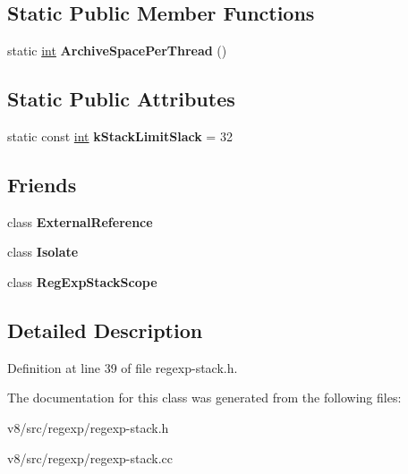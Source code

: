 \subsection*{Static Public Member Functions}
\begin{DoxyCompactItemize}
\item 
\mbox{\label{classv8_1_1internal_1_1RegExpStack_aee574d88604a5759319c17356a2202f4}} 
static \mbox{\hyperlink{classint}{int}} {\bfseries Archive\+Space\+Per\+Thread} ()
\end{DoxyCompactItemize}
\subsection*{Static Public Attributes}
\begin{DoxyCompactItemize}
\item 
\mbox{\label{classv8_1_1internal_1_1RegExpStack_a204fe3ec05de664a5b0d89cb4150f069}} 
static const \mbox{\hyperlink{classint}{int}} {\bfseries k\+Stack\+Limit\+Slack} = 32
\end{DoxyCompactItemize}
\subsection*{Friends}
\begin{DoxyCompactItemize}
\item 
\mbox{\label{classv8_1_1internal_1_1RegExpStack_a6cad52a007e84a78f169131b667e2d49}} 
class {\bfseries External\+Reference}
\item 
\mbox{\label{classv8_1_1internal_1_1RegExpStack_aba4f0964bdacf2bbf62cf876e5d28d0a}} 
class {\bfseries Isolate}
\item 
\mbox{\label{classv8_1_1internal_1_1RegExpStack_af3a599fb70f578aa7d436828690530b8}} 
class {\bfseries Reg\+Exp\+Stack\+Scope}
\end{DoxyCompactItemize}


\subsection{Detailed Description}


Definition at line 39 of file regexp-\/stack.\+h.



The documentation for this class was generated from the following files\+:\begin{DoxyCompactItemize}
\item 
v8/src/regexp/regexp-\/stack.\+h\item 
v8/src/regexp/regexp-\/stack.\+cc\end{DoxyCompactItemize}
